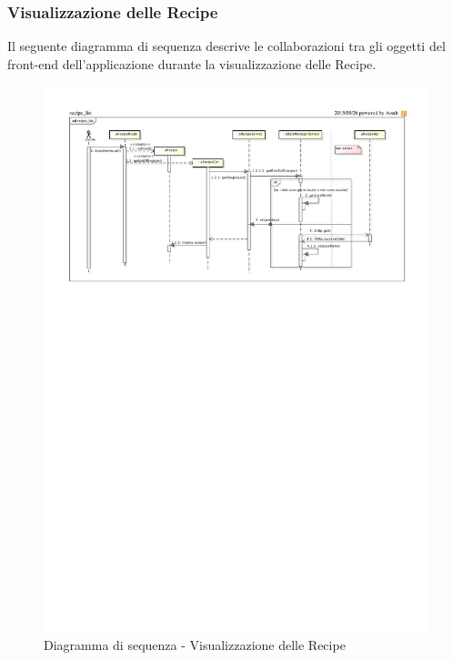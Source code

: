 	\subsubsection{Visualizzazione delle Recipe} %
	\label{ssub:visualizzazione_delle_recipe}
	Il seguente diagramma di sequenza descrive le collaborazioni tra gli oggetti del front-end dell'applicazione durante la visualizzazione delle Recipe. \newline

\begin{figure}[htbp]
	\centering
	\centerline{\includegraphics[scale=1.03]{./images/sequence_diagram/client_view_recipe.pdf}}
	\caption{Diagramma di sequenza - Visualizzazione delle Recipe}
\end{figure}

	

